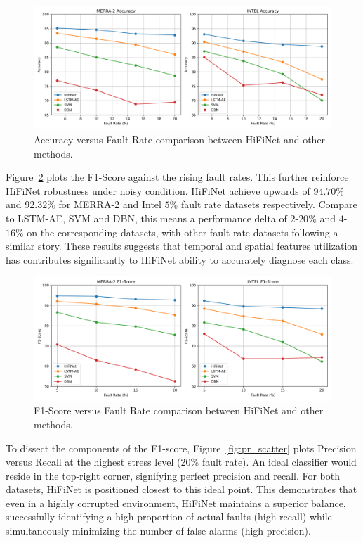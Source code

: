 \begin{figure}
  \centering
  \includegraphics[width=\linewidth]{images/accuracy.png}
  \caption{Accuracy versus Fault Rate comparison between HiFiNet and other methods.}
  \label{fig:accuracy}
\end{figure}

Figure~\ref{fig:f1} plots the F1-Score against the rising fault rates. This further reinforce HiFiNet robustness under noisy condition. HiFiNet achieve upwards of \(94.70\%\) and \(92.32\%\) for MERRA-2 and Intel \(5\%\) fault rate datasets respectively. Compare to LSTM-AE, SVM and DBN, this means a performance delta of \(2\)-\(20\%\) and \(4\)-\(16\%\) on the corresponding datasets, with other fault rate datasets following a similar story. These results suggests that temporal and spatial features utilization has contributes significantly to HiFiNet ability to accurately diagnose each class.

\begin{figure}
  \centering
  \includegraphics[width=\linewidth]{images/f1.png}
  \caption{F1-Score versus Fault Rate comparison between HiFiNet and other methods.}
  \label{fig:f1}
\end{figure}

To dissect the components of the F1-score, Figure~\ref{fig:pr_scatter} plots Precision versus Recall at the highest stress level (20\% fault rate). An ideal classifier would reside in the top-right corner, signifying perfect precision and recall. For both datasets, HiFiNet is positioned closest to this ideal point. This demonstrates that even in a highly corrupted environment, HiFiNet maintains a superior balance, successfully identifying a high proportion of actual faults (high recall) while simultaneously minimizing the number of false alarms (high precision).

